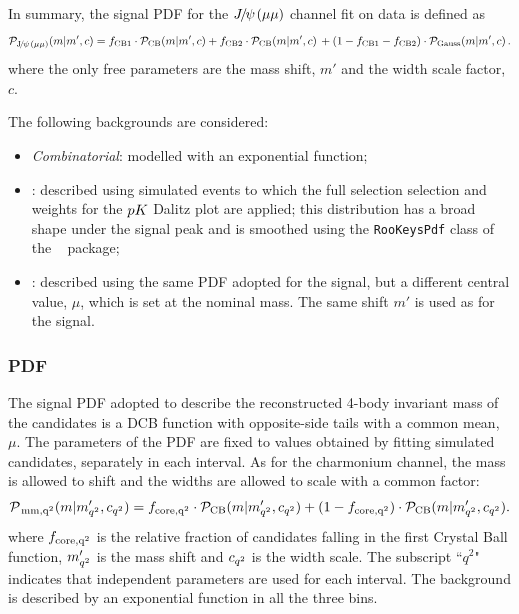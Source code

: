 In summary, the signal PDF for the $\jpsi(\mu\mu)$ channel fit on data is defined as
%
$$\mathcal{P}_{\rm \jpsi(\mu\mu)}(m | m', c) = 
f_{\rm CB1} \cdot \mathcal{P}_{\rm CB}(m | m', c) + 
f_{\rm CB2} \cdot \mathcal{P}_{\rm CB}(m | m', c) \, +
(1 - f_{\rm CB1} -f_{\rm CB2}) \cdot \mathcal{P}_{\rm Gauss}(m | m', c) \, .$$
%
where the only free parameters are the mass shift, $m'$ and the width scale factor, $c$.


The following backgrounds are considered:

\begin{itemize}

\item \textit{Combinatorial}: modelled with an exponential function;

\item \LbTopKJPsmm: described using simulated events to which the full selection selection and weights for the $p{K}$ Dalitz plot are applied; this distribution has a broad shape under the signal peak and is smoothed using the \verb!RooKeysPdf! class of the \roofit~\cite{Verkerke:2003ir} package;

\item \BsToKstJPsmm: described using the same PDF adopted for the signal, but a different central 
value, $\mu$, which is set at the \Bs nominal mass. The same shift $m'$  is used as for the signal.

\end{itemize}


\subsubsection{\BdToKstmm PDF}

The signal PDF adopted to describe the reconstructed 4-body invariant mass of the \BdToKstmm candidates 
is a DCB function with opposite-side tails with a common mean, $\mu$.
The parameters of the PDF are fixed to values obtained by fitting simulated candidates, separately in each \qsq interval.
As for the charmonium channel, the mass is allowed to shift and the widths are allowed to scale with a common factor:
%
$$\mathcal{P}_{\rm \rm \,mm, {q^2}}(m | m'_{{q^2}}, c_{{q^2}}) = 
f_{\rm core, {q^2}} \cdot \mathcal{P}_{\rm CB}(m | m'_{{q^2}}, c_{{q^2}}) + 
(1 - f_{\rm core, {q^2}}) \cdot \mathcal{P}_{\rm CB}(m | m'_{{q^2}}, c_{{q^2}}).$$
%
where $f_{\rm core, {q^2}}$ is the relative fraction of candidates falling in the first Crystal Ball function, $m'_{{q^2}}$ is the mass shift and $c_{{q^2}}$ is the width scale.
The subscript ``$q^2$" indicates that independent parameters are used for each \qsq interval.
The background is described by an exponential function in all the three \qsq bins.

